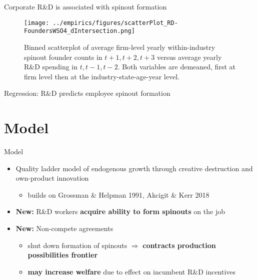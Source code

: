 \documentclass[english,usenames,dvipsnames]{beamer}
\begin{document}
\begin{frame}{Corporate R\&D is associated with spinout formation}
	\begin{figure}[!htb]
		\centering
		\texttt{[image: ../empirics/figures/scatterPlot\_RD-FoundersWSO4\_dIntersection.png]}
		\caption{\footnotesize Binned scatterplot of average firm-level yearly within-industry spinout founder counts in $t+1,t+2,t+3$ versus average yearly R\&D spending in $t,t-1,t-2$. Both variables are demeaned, first at firm level then at the industry-state-age-year level.}
	\end{figure}
\end{frame}

\begin{frame}{Regression: R\&D predicts employee spinout formation}
	\begin{table}
		\Tiny
		\centering
		
		\caption{\scriptsize The dependent variable is average yearly number of founders joining WSOs (4-digit NAICS) in years $t+1,t+2,t+3$. The independent variables are averages over $t,t-1,t-2$. Firm controls are employment, assets, intangible assets, investment, net income, sales, cumulative citation-weighted patents, and market value (1) or Tobin's Q (2-4).}
	\end{table}
\end{frame}


\section{Model}

\begin{frame}
	\tableofcontents[currentsection]
\end{frame}

\begin{frame}{Model}
	\begin{itemize}	
		\item Quality ladder model of endogenous growth through creative destruction and own-product innovation
		\begin{itemize}
			\item builds on Grossman \& Helpman 1991, Akcigit \& Kerr 2018
		\end{itemize}
		\medskip
		\item \alert{\textbf{New:}} R\&D workers \textbf{\alert{acquire ability to form spinouts}} on the job
		\medskip
		\item \alert{\textbf{New:}} Non-compete agreements
		\begin{itemize}
			\item shut down formation of spinouts $\Rightarrow$ \textbf{\alert{contracts production possibilities frontier}}
			\item \textbf{\alert{may increase welfare}} due to effect on incumbent R\&D incentives
		\end{itemize}
	\end{itemize}
\end{frame}
\end{document}
